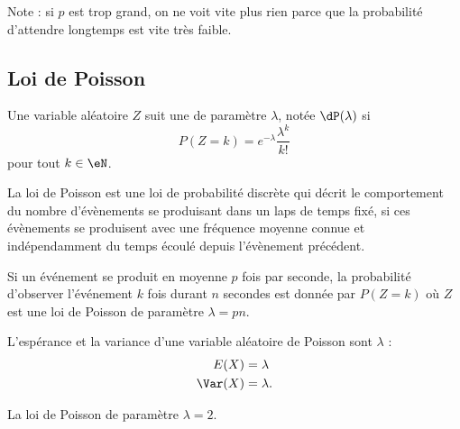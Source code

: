 \begin{center}
	
\end{center}
Note : si \( p\) est trop grand, on ne voit vite plus rien parce que la probabilité d'attendre longtemps est vite très faible.

\subsection{Loi de Poisson}

\begin{definition}      \label{DEFooUWKHooUFKlcr}
	Une variable aléatoire \( Z\) suit une  de paramètre \( \lambda\), notée \( \dP(\lambda)\) si
	\begin{equation}        \label{EQooLGLUooLXohWe}
		P(Z=k)= e^{-\lambda}\frac{ \lambda^k }{ k! }
	\end{equation}
	pour tout \( k\in\eN\).
\end{definition}

La loi de Poisson est une loi de probabilité discrète qui décrit le comportement du nombre d'évènements se produisant dans un laps de temps fixé, si ces évènements se produisent avec une fréquence moyenne connue et indépendamment du temps écoulé depuis l'évènement précédent.

Si un événement se produit en moyenne \( p\) fois par seconde, la probabilité d'observer l'événement \( k\) fois durant \( n\) secondes est donnée par \( P(Z=k)\) où \( Z\) est une loi de Poisson de paramètre \( \lambda=pn\).

\begin{theorem}      \label{ThojDZjuj}
	L'espérance et la variance d'une variable aléatoire de Poisson sont \( \lambda\) :
	\begin{subequations}
		\begin{align}
			E(X)    & =\lambda  \\
			\Var(X) & =\lambda.
		\end{align}
	\end{subequations}
\end{theorem}

La loi de Poisson de paramètre \( \lambda=2\).

